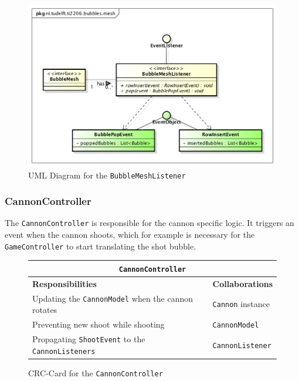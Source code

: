 \documentclass[a4paper]{article}
\begin{document}
\begin{figure}[H]
    \centering
	\includegraphics[scale=0.5]{BubbleMeshListener.png}
    \caption{UML Diagram for the \texttt{BubbleMeshListener}}
\end{figure}


\subsubsection*{CannonController}
The \texttt{CannonController} is responsible for the cannon specific logic. It triggers an event when the cannon shoots, which for example is necessary for the \texttt{GameController} to start translating the shot bubble.

\begin{figure}[H]
    \begin{center}
    \begin{tabular}{ | p{8cm} | p{4cm} | }
      \multicolumn{2}{c}{\texttt{CannonController}} \\ \hline
      \textbf{Responsibilities} & \textbf{Collaborations} \\ \hline
      Updating the \texttt{CannonModel} when the cannon rotates & \texttt{Cannon} instance \\
      Preventing new shoot while shooting & \texttt{CannonModel} \\
      Propagating \texttt{ShootEvent} to the \texttt{CannonListeners} & \texttt{CannonListener} \\
      \hline
    \end{tabular}
    \end{center}
    \caption{CRC-Card for the \texttt{CannonController}}
\end{figure}
\end{document}
